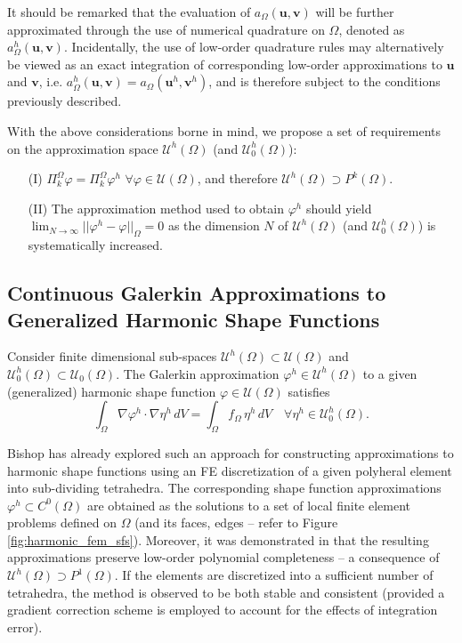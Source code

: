 	It should be remarked that the evaluation of $a_{\Omega}(\mathbf{u},\mathbf{v})$ will be further approximated through the use of numerical quadrature on $\Omega$, denoted as $a^h_{\Omega}(\mathbf{u},\mathbf{v})$. Incidentally, the use of low-order quadrature rules may alternatively be viewed as an exact integration of corresponding low-order approximations to $\mathbf{u}$ and $\mathbf{v}$, i.e. $a^h_{\Omega}(\mathbf{u},\mathbf{v}) = a_{\Omega}(\mathbf{u}^h,\mathbf{v}^h)$, and is therefore subject to the conditions previously described.
	
	With the above considerations borne in mind, we propose a set of requirements on the approximation space $\mathcal{U}^h (\Omega)$ (and $\mathcal{U}^h_0 (\Omega)$):
	\begin{itemize}
		\item[(I)] $\Pi^{\Omega}_k \varphi = \Pi^{\Omega}_k \varphi^h \, \, \forall \varphi \in \mathcal{U}(\Omega)$, and therefore $\mathcal{U}^h (\Omega) \supset P^k (\Omega)$.
		\item[(II)] The approximation method used to obtain $\varphi^h$ should yield $\lim_{N \rightarrow \infty} || \varphi^h - \varphi ||_{\Omega} = 0$ as the dimension $N$ of $\mathcal{U}^h (\Omega)$ (and $\mathcal{U}^h_0 (\Omega)$) is systematically increased.
	\end{itemize}
	
\subsection*{Continuous Galerkin Approximations to \\ Generalized Harmonic Shape Functions}

	Consider finite dimensional sub-spaces $\mathcal{U}^h (\Omega) \subset \mathcal{U} (\Omega)$ and $\mathcal{U}^h_0 (\Omega) \subset \mathcal{U}_0 (\Omega)$. The Galerkin approximation $\varphi^h \in \mathcal{U}^h (\Omega)$ to a given (generalized) harmonic shape function $\varphi \in \mathcal{U} (\Omega)$ satisfies
	\begin{equation}
		\int_\Omega \nabla \varphi^h \cdot \nabla \eta^h \, dV = \int_\Omega f_{\Omega} \, \eta^h \, dV \quad \forall \eta^h \in \mathcal{U}^h_0 (\Omega).
		\label{eq:weak_poisson}
	\end{equation}
	
	Bishop has already explored such an approach for constructing approximations to harmonic shape functions using an FE discretization of a given polyheral element into sub-dividing tetrahedra. The corresponding shape function approximations $\varphi^h \subset C^0 (\Omega)$ are obtained as the solutions to a set of local finite element problems defined on $\Omega$ (and its faces, edges -- refer to Figure \ref{fig:harmonic_fem_sfs}). Moreover, it was demonstrated in \cite{Bishop:14} that the resulting approximations preserve low-order polynomial completeness -- a consequence of $\mathcal{U}^h (\Omega) \supset P^1 (\Omega)$. If the elements are discretized into a sufficient number of tetrahedra, the method is observed to be both stable and consistent (provided a gradient correction scheme is employed to account for the effects of integration error).
	
